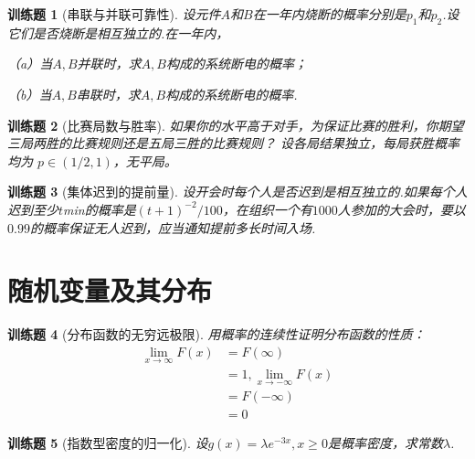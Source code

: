 \documentclass[UTF8,12pt,a4paper,fontset=fandol]{ctexbook}
\newtheorem{exercise}{训练题}[section]
\begin{document}
\begin{exercise}[串联与并联可靠性]\label{q:Y2.32}
设元件$A$和$B$在一年内烧断的概率分别是$p_1$和$p_2$.设它们是否烧断是相互独立的.在一年内，

（a）当$A,B$并联时，求$A,B$构成的系统断电的概率；

（b）当$A,B$串联时，求$A,B$构成的系统断电的概率.\par{}\end{exercise}

\begin{exercise}[比赛局数与胜率]\label{q:Y2.33}
如果你的水平高于对手，为保证比赛的胜利，你期望三局两胜的比赛规则还是五局三胜的比赛规则？ 设各局结果独立，每局获胜概率均为 $p\in(1/2,1)$，无平局。\par{}\end{exercise}

\begin{exercise}[集体迟到的提前量]\label{q:Y2.34}
设开会时每个人是否迟到是相互独立的.如果每个人迟到至少$t$min的概率是$(t+1)^{-2}/100$，在组织一个有$1000$人参加的大会时，要以$0.99$的概率保证无人迟到，应当通知提前多长时间入场.\par{}\end{exercise}

\clearpage\section{随机变量及其分布}

\begin{exercise}[分布函数的无穷远极限]\label{q:Y3.1}
用概率的连续性证明分布函数的性质：
\[\begin{aligned}\mathop {\lim }\limits_{x \to \infty } F(x) &= F(\infty ) \\&= 1,\mathop {\lim }\limits_{x \to  - \infty } F(x) \\&= F( - \infty ) \\&= 0\end{aligned}\]\par{}\end{exercise}

\begin{exercise}[指数型密度的归一化]\label{q:Y3.2}
设$g(x)=\lambda e^{-3x},x\geqslant 0$是概率密度，求常数$\lambda$.\par{}\end{exercise}
\end{document}
